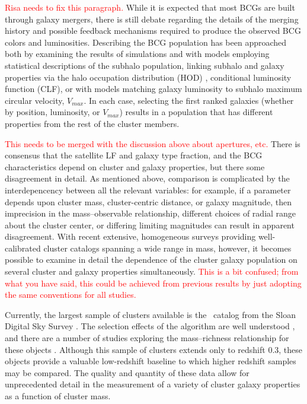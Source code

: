 \documentclass{emulateapj}
\begin{document}
\textcolor{red}{Risa needs to fix this paragraph.} While it is expected that
most BCGs are built through galaxy mergers, there is still debate regarding the
details of the merging history and possible feedback mechanisms required to
produce the observed BCG colors and luminosities.  Describing the BCG
population has been approached both by examining the results of simulations
\citep{AS98,Dubinski98,Gao04a,BK06,DeLucia07} and with models employing
statistical descriptions of the subhalo population, linking subhalo and galaxy
properties via the halo occupation distribution (HOD)
\citep[e.g.][]{Scoccimarro01,Berlind03,Zheng05}, conditional luminosity
function (CLF)\citep[e.g.][]{vdB03,Cooray05}, or with models matching galaxy
luminosity to subhalo maximum circular velocity,
$V_{max}$\citep[e.g.][]{KK99,Tasitsiomi04,Conroy06,VO06}. In each case,
selecting the first ranked galaxies (whether by position, luminosity, or
$V_{max}$) results in a population that has different properties from the rest
of the cluster members.

\textcolor{red}{This needs to be merged with the discussion above about
apertures, etc.} There is consensus that the satellite LF and galaxy type
fraction, and the BCG characteristics depend on cluster and galaxy properties,
but there some disagreement in detail. As mentioned above, comparison is
complicated by the interdepencency between all the relevant variables: for
example, if a parameter depends upon cluster mass, cluster-centric distance, or
galaxy magnitude, then imprecision in the mass--observable relationship,
different choices of radial range about the cluster center, or differing
limiting magnitudes can result in apparent disagreement. With recent extensive,
homogeneous surveys providing well-calibrated cluster catalogs spanning a wide
range in mass, however, it becomes possible to examine in detail the dependence
of the cluster galaxy population on several cluster and galaxy properties
simultaneously. \textcolor{red}{This is a bit confused; from what you have
said, this could be achieved from previous results by just adopting the
same conventions for all studies.}

Currently, the largest sample of clusters available is the \maxbcg\ catalog from
the Sloan Digital Sky Survey \citep{Koester07a}.  The selection effects of the
algorithm are well understood \citep{Koester07b, Rozo07a}, and there are a
number of studies exploring the mass--richness relationship for these objects
\citep{Rozo07b,Becker07,Sheldon07a, Johnston07b,Rykoff07,Rozo08}.  Although
this sample of clusters extends only to redshift 0.3, these objects provide a
valuable low-redshift baseline to which higher redshift samples may be
compared. The quality and quantity of these data allow for unprecedented detail
in the measurement of a variety of cluster galaxy properties as a function of
cluster mass.
\end{document}

